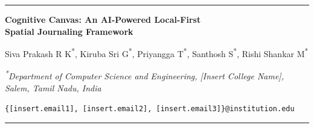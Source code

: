 \documentclass[12pt, letterpaper]{article}
\newcommand{\mytitlerule}{%
  {\color{MidnightBlue!60}\rule{\linewidth}{1.5pt}}%
}
\begin{document}
\thispagestyle{empty}


\vspace*{0.3in}
\mytitlerule
\vspace{10pt}

{\LARGE\bfseries Cognitive Canvas: An AI-Powered Local-First\\[4pt]
Spatial Journaling Framework}

\vspace{14pt}

{\large
Siva Prakash R K\textsuperscript{*},\;
Kiruba Sri G\textsuperscript{*},\;
Priyangga T\textsuperscript{*},\;
Santhosh S\textsuperscript{*},\;
Rishi Shankar M\textsuperscript{*}
}

\vspace{6pt}

{\normalsize\textit{
\textsuperscript{*}Department of Computer Science and Engineering,
[Insert College Name], Salem, Tamil Nadu, India
}}

\vspace{4pt}

{\small
\texttt{\{[insert.email1],\,[insert.email2],\,[insert.email3]\}@institution.edu}
}

\vspace{10pt}
\mytitlerule
\vspace{18pt}

\end{document}
